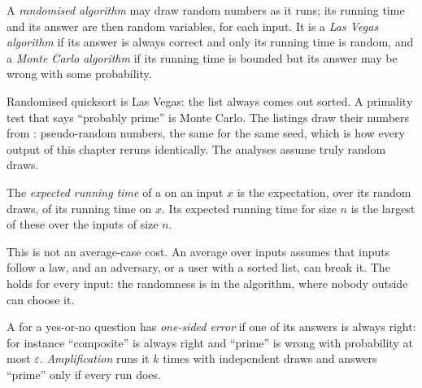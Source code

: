 \begin{definition}\label{def:b2:randomised-algorithms:las-vegas}
A \emph{randomised algorithm} may draw random numbers as it runs; its running time and its
answer are then random variables, for each input. It is a \emph{Las Vegas algorithm} if its
answer is always correct and only its running time is random, and a \emph{Monte Carlo algorithm} if its running time is bounded but its answer may be wrong with some probability.
\end{definition}

Randomised quicksort is Las Vegas: the list always comes out sorted. A primality test that says ``probably prime'' is
Monte Carlo. The listings draw their numbers from : pseudo-random numbers, the same for the
same seed, which is how every output of this chapter reruns identically. The analyses assume truly random draws.

\begin{definition}\label{def:b2:randomised-algorithms:expected-time}
The \emph{expected running time} of a  on an input $x$ is the
expectation, over its random draws, of its running time on $x$. Its expected running time for size $n$ is the largest of
these over the inputs of size $n$.
\end{definition}

This is not an average-case cost. An average over inputs assumes that inputs follow a law, and an adversary, or a user
with a sorted list, can break it. The  holds for every input: the randomness is in the algorithm,
where nobody outside can choose it.

\begin{definition}\label{def:b2:randomised-algorithms:amplification}
A  for a yes-or-no question has \emph{one-sided error} if one of its answers
is always right: for instance ``composite'' is always right and ``prime'' is wrong with probability at most $\varepsilon$.
\emph{Amplification} runs it $k$ times with independent draws and answers ``prime'' only if every
run does.
\end{definition}

